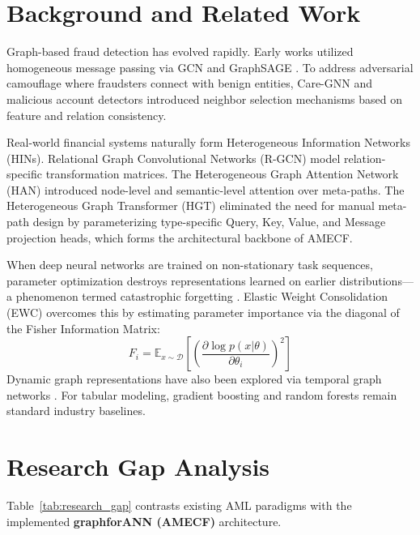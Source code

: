 \documentclass[conference]{IEEEtran}
\begin{document}
\section{Background and Related Work}
Graph-based fraud detection has evolved rapidly. Early works utilized homogeneous message passing via GCN \cite{kipf2017semi} and GraphSAGE \cite{hamilton2017inductive}. To address adversarial camouflage where fraudsters connect with benign entities, Care-GNN \cite{dou2020enhancing} and malicious account detectors \cite{liu2018heterogeneous} introduced neighbor selection mechanisms based on feature and relation consistency.

Real-world financial systems naturally form Heterogeneous Information Networks (HINs). Relational Graph Convolutional Networks (R-GCN) \cite{schlichtkrull2018modeling} model relation-specific transformation matrices. The Heterogeneous Graph Attention Network (HAN) \cite{wang2019heterogeneous} introduced node-level and semantic-level attention over meta-paths. The Heterogeneous Graph Transformer (HGT) \cite{hu2020heterogeneous} eliminated the need for manual meta-path design by parameterizing type-specific Query, Key, Value, and Message projection heads, which forms the architectural backbone of AMECF.

When deep neural networks are trained on non-stationary task sequences, parameter optimization destroys representations learned on earlier distributions---a phenomenon termed catastrophic forgetting \cite{french1999catastrophic}. Elastic Weight Consolidation (EWC) \cite{kirkpatrick2017overcoming} overcomes this by estimating parameter importance via the diagonal of the Fisher Information Matrix:
\begin{equation}
F_i = \mathbb{E}_{x \sim \mathcal{D}}\left[ \left(\frac{\partial \log p(x|\theta)}{\partial \theta_i}\right)^2 \right]
\label{eq:fisher}
\end{equation}
Dynamic graph representations have also been explored via temporal graph networks \cite{rossi2020temporal}. For tabular modeling, gradient boosting \cite{chen2016xgboost} and random forests \cite{breiman2001random} remain standard industry baselines.

\section{Research Gap Analysis}
Table~\ref{tab:research_gap} contrasts existing AML paradigms with the implemented \textbf{graphforANN (AMECF)} architecture.
\end{document}
